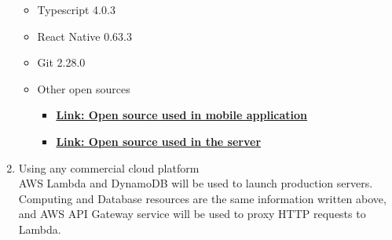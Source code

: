 \documentclass[conference]{IEEEtran}
\begin{document}
\begin{enumerate}
\begin{itemize}
        \item Typescript 4.0.3
        \item React Native 0.63.3
        \item Git 2.28.0 
        \item Other open sources
            \begin{itemize}
                \item \href{https://github.com/6-things-must-to-do/app/blob/develop/package.json}{\textbf{Link: Open source used in mobile application}}
                \item \href{https://github.com/6-things-must-to-do/backend/blob/develop/go.mod}{\textbf{Link: Open source used in the server}}
            \end{itemize}
    \end{itemize}
    \item Using any commercial cloud platform \\
    
    AWS Lambda and DynamoDB will be used to launch production servers.  Computing and Database resources are the same information written above, and AWS API Gateway service will be used to proxy HTTP requests to Lambda. \\
    
\end{enumerate}
\end{document}
